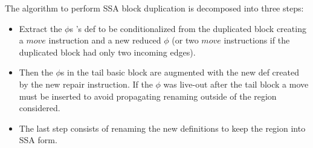 The algorithm to perform SSA block duplication is decomposed into three steps: 
\begin{itemize}
\item Extract the $\phi$s 's def to be conditionalized from the duplicated block creating a $move$ instruction and a new reduced $\phi$ (or two $move$ instructions if the duplicated block had only two incoming edges).
\item Then the $\phi$s in the tail basic block are augmented with the new def created by the new repair instruction. If the $\phi$ was live-out after the tail block a move must be inserted to avoid propagating renaming outside of the region considered. 
\item The last step consists of renaming the new definitions to keep the region into SSA form.
\end{itemize}

